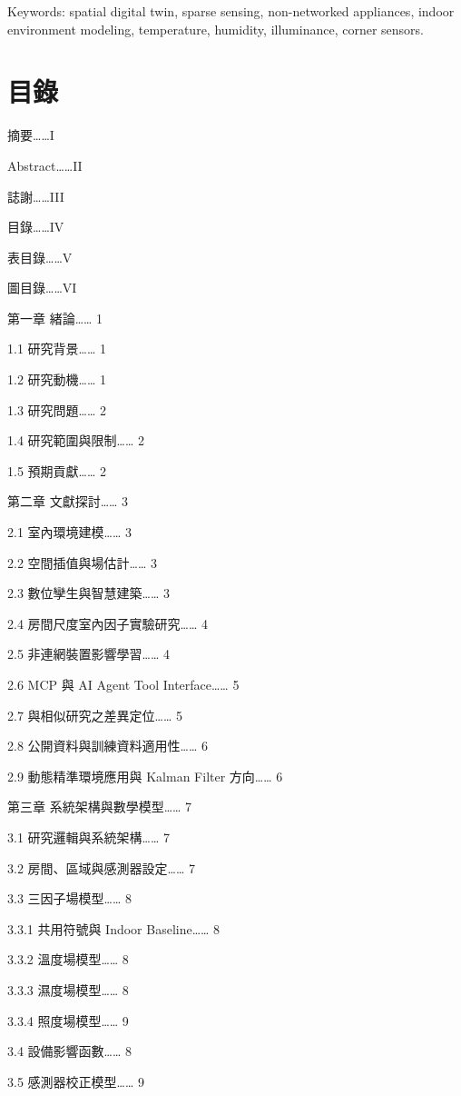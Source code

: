 \documentclass[12pt,a4paper]{article}
\begin{document}
Keywords: spatial digital twin, sparse sensing, non-networked appliances, indoor environment modeling, temperature, humidity, illuminance, corner sensors.


\clearpage

\section*{目錄}

摘要……I


Abstract……II


誌謝……III


目錄……IV


表目錄……V


圖目錄……VI


第一章 緒論…… 1


  1.1 研究背景…… 1


  1.2 研究動機…… 1


  1.3 研究問題…… 2


  1.4 研究範圍與限制…… 2


  1.5 預期貢獻…… 2


第二章 文獻探討…… 3


  2.1 室內環境建模…… 3


  2.2 空間插值與場估計…… 3


  2.3 數位孿生與智慧建築…… 3


  2.4 房間尺度室內因子實驗研究…… 4


  2.5 非連網裝置影響學習…… 4


  2.6 MCP 與 AI Agent Tool Interface…… 5


  2.7 與相似研究之差異定位…… 5


  2.8 公開資料與訓練資料適用性…… 6


  2.9 動態精準環境應用與 Kalman Filter 方向…… 6


第三章 系統架構與數學模型…… 7


  3.1 研究邏輯與系統架構…… 7


  3.2 房間、區域與感測器設定…… 7


  3.3 三因子場模型…… 8


    3.3.1 共用符號與 Indoor Baseline…… 8


    3.3.2 溫度場模型…… 8


    3.3.3 濕度場模型…… 8


    3.3.4 照度場模型…… 9


  3.4 設備影響函數…… 8


  3.5 感測器校正模型…… 9
\end{document}
